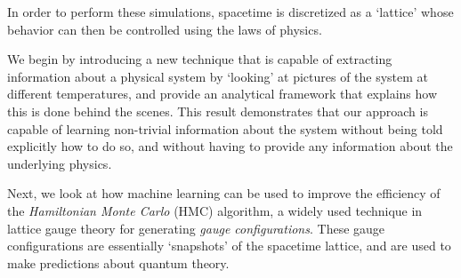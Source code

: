 \begin{doublespace}
%
In order to perform these simulations, spacetime is discretized as a `lattice' whose behavior can then be controlled
using the laws of physics.

We begin by introducing a new technique that is capable of extracting information about a physical system by `looking'
at pictures of the system at different temperatures, and provide an analytical framework that explains how this is done
behind the scenes.
%
This result demonstrates that our approach is capable of learning non-trivial information about the system without
being told explicitly how to do so, and without having to provide any information about the underlying physics.
%

Next, we look at how machine learning can be used to improve the efficiency of the \emph{Hamiltonian Monte Carlo} (HMC)
algorithm, a widely used technique in lattice gauge theory for generating \emph{gauge configurations}.
%
These gauge configurations are essentially `snapshots' of the spacetime lattice, and are used to make predictions
about quantum theory.


\end{doublespace}

